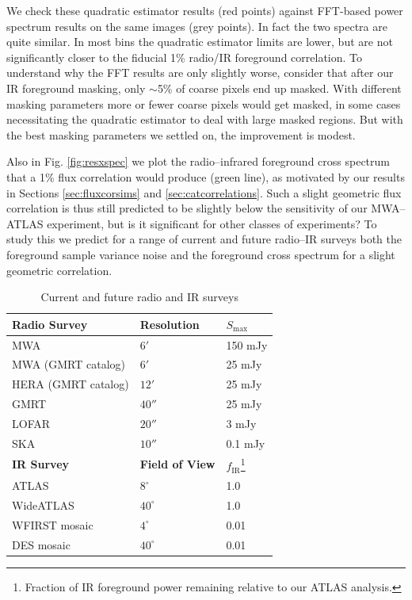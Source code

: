 \documentclass[numberedappendix]{emulateapj}
\newcommand{\ir}{\text{IR}}
\begin{document}
We check these quadratic estimator results (red points) against FFT-based power spectrum results on the same images (grey points). In fact the two spectra are quite similar. In most bins the quadratic estimator limits are lower, but are not significantly closer to the fiducial 1\% radio/IR foreground correlation. To understand why the FFT results are only slightly worse, consider that after our IR foreground masking, only $\sim$5\% of coarse pixels end up masked. With different masking parameters more or fewer coarse pixels would get masked, in some cases necessitating the quadratic estimator to deal with large masked regions. But with the best masking parameters we settled on, the improvement is modest. 

 
Also in Fig. \ref{fig:resxspec} we plot the radio--infrared foreground cross spectrum that a 1\% flux correlation would produce (green line), as motivated by our results in Sections \ref{sec:fluxcorsims} and \ref{sec:catcorrelations}. Such a slight geometric flux correlation is thus still predicted to be slightly below the sensitivity of our MWA--ATLAS experiment, but is it significant for other classes of experiments? To study this we predict for a range of current and future radio--IR surveys both the foreground sample variance noise and the foreground cross spectrum for a slight geometric correlation. 


\begin{table}
\caption{Current and future radio and IR surveys\label{tab:expts}}
\begin{tabular}{|l | l | l|}
\hline
\textbf{Radio Survey} & \textbf{Resolution} & \textbf{$S_\text{max}$} \\
\hline
MWA & $6'$ & 150 mJy \\
MWA (GMRT catalog) & $6'$ & 25 mJy \\
HERA (GMRT catalog) & $12'$ & 25 mJy \\
GMRT & $40''$ & 25 mJy \\
LOFAR & $20''$ & 3 mJy \\
SKA & $10''$ & 0.1 mJy \\
\hline\hline
\textbf{IR Survey} & \textbf{Field of View} & \textbf{$f_\ir$}\footnote{Fraction of IR foreground power remaining relative to our ATLAS analysis.} \\
\hline
ATLAS & $8^\circ$ & 1.0 \\
WideATLAS & $40^\circ$ & 1.0 \\
WFIRST mosaic & $4^\circ$ & 0.01 \\
DES mosaic & $40^\circ$ & 0.01 \\
\hline
\end{tabular}
\end{table}
\end{document}
